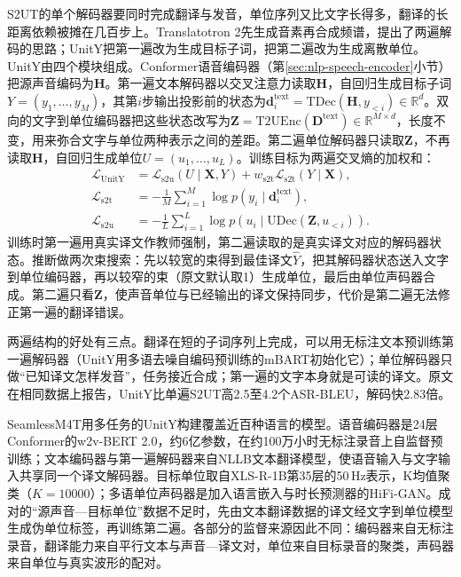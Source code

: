 S2UT的单个解码器要同时完成翻译与发音，单位序列又比文字长得多，翻译的长距离依赖被摊在几百步上。Translatotron 2先生成音素再合成频谱，提出了两遍解码的思路\cite{nlp-speech-jia2022translatotron2}；UnitY把第一遍改为生成目标子词，把第二遍改为生成离散单位。UnitY由四个模块组成。Conformer语音编码器（第\ref{sec:nlp-speech-encoder}小节）把源声音编码为$\bm H$。第一遍文本解码器以交叉注意力读取$\bm H$，自回归生成目标子词$Y=(y_1,\ldots,y_M)$，其第$i$步输出投影前的状态为$\bm d^{\mathrm{text}}_i=\mathrm{TDec}(\bm H,y_{<i})\in\mathbb R^{d}$。双向的文字到单位编码器把这些状态改写为$\bm Z=\mathrm{T2UEnc}(\bm D^{\mathrm{text}})\in\mathbb R^{M\times d}$，长度不变，用来弥合文字与单位两种表示之间的差距。第二遍单位解码器只读取$\bm Z$，不再读取$\bm H$，自回归生成单位$U=(u_1,\ldots,u_L)$。训练目标为两遍交叉熵的加权和：
\begin{equation}
 \begin{aligned}
 \mathcal L_{\mathrm{UnitY}}
 &=\mathcal L_{\mathrm{s2u}}(U\mid\bm X,Y)+w_{\mathrm{s2t}}\mathcal L_{\mathrm{s2t}}(Y\mid\bm X),\\
 \mathcal L_{\mathrm{s2t}}&=-\frac1M\sum_{i=1}^{M}\log p(y_i\mid\bm d^{\mathrm{text}}_i),\\
 \mathcal L_{\mathrm{s2u}}&=-\frac1L\sum_{i=1}^{L}\log p(u_i\mid\mathrm{UDec}(\bm Z,u_{<i})).
 \end{aligned}
 \label{eq:nlp-speech-unity}
\end{equation}
训练时第一遍用真实译文作教师强制，第二遍读取的是真实译文对应的解码器状态。推断做两次束搜索：先以较宽的束得到最佳译文$\hat Y$，把其解码器状态送入文字到单位编码器，再以较窄的束（原文默认取1）生成单位，最后由单位声码器合成。第二遍只看$\bm Z$，使声音单位与已经输出的译文保持同步，代价是第二遍无法修正第一遍的翻译错误。

两遍结构的好处有三点。翻译在短的子词序列上完成，可以用无标注文本预训练第一遍解码器（UnitY用多语去噪自编码预训练的mBART初始化它）；单位解码器只做“已知译文怎样发音”，任务接近合成；第一遍的文字本身就是可读的译文。原文在相同数据上报告，UnitY比单遍S2UT高2.5至4.2个ASR-BLEU，解码快2.83倍。

SeamlessM4T用多任务的UnitY构建覆盖近百种语言的模型。语音编码器是24层Conformer的w2v-BERT 2.0，约6亿参数，在约100万小时无标注录音上自监督预训练；文本编码器与第一遍解码器来自NLLB文本翻译模型，使语音输入与文字输入共享同一个译文解码器。目标单位取自XLS-R-1B第35层的50\,Hz表示，K均值聚类（$K=10000$）；多语单位声码器是加入语言嵌入与时长预测器的HiFi-GAN。成对的“源声音—目标单位”数据不足时，先由文本翻译数据的译文经文字到单位模型生成伪单位标签，再训练第二遍。各部分的监督来源因此不同：编码器来自无标注录音，翻译能力来自平行文本与声音—译文对，单位来自目标录音的聚类，声码器来自单位与真实波形的配对。

